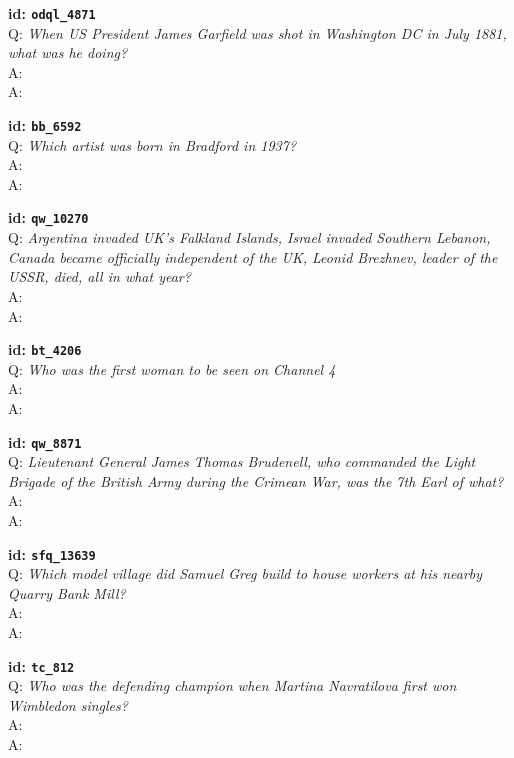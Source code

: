 \tiny{\setlength{\parindent}{0cm}
\textbf{id: \texttt{odql\_4871}} \\
Q: \textit{When US President James Garfield was shot in Washington DC in July 1881, what was he doing?} \\
A:  \\
A: }

\tiny{\setlength{\parindent}{0cm}
\textbf{id: \texttt{bb\_6592}} \\
Q: \textit{Which artist was born in Bradford in 1937?} \\
A:  \\
A: }

\tiny{\setlength{\parindent}{0cm}
\textbf{id: \texttt{qw\_10270}} \\
Q: \textit{Argentina invaded UK's Falkland Islands, Israel invaded Southern Lebanon, Canada became officially independent of the UK, Leonid Brezhnev, leader of the USSR, died, all in what year?} \\
A:  \\
A: }

\tiny{\setlength{\parindent}{0cm}
\textbf{id: \texttt{bt\_4206}} \\
Q: \textit{Who was the first woman to be seen on Channel 4} \\
A:  \\
A: }

\tiny{\setlength{\parindent}{0cm}
\textbf{id: \texttt{qw\_8871}} \\
Q: \textit{Lieutenant General James Thomas Brudenell, who commanded the Light Brigade of the British Army during the Crimean War, was the 7th Earl of what?} \\
A:  \\
A: }

\tiny{\setlength{\parindent}{0cm}
\textbf{id: \texttt{sfq\_13639}} \\
Q: \textit{Which model village did Samuel Greg build to house workers at his nearby Quarry Bank Mill?} \\
A:  \\
A: }

\tiny{\setlength{\parindent}{0cm}
\textbf{id: \texttt{tc\_812}} \\
Q: \textit{Who was the defending champion when Martina Navratilova first won Wimbledon singles?} \\
A:  \\
A: }

